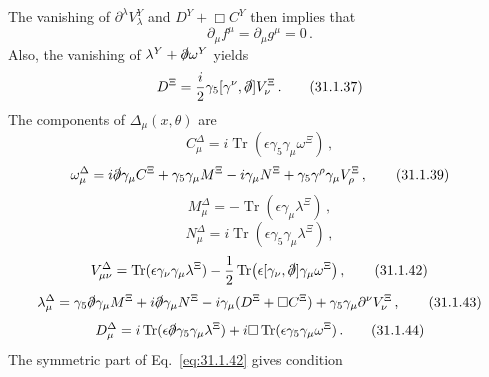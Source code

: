 The vanishing of \(\partial^\lambda V_\lambda^Y\) and
\(D^Y+\Box C^Y\) then implies that
\begin{equation}
  \partial_\mu f^\mu=\partial_\mu g^\mu=0\,.
  \tag{31.1.36}\label{eq:31.1.36}
\end{equation}
Also, the vanishing of \(\lambda^Y+\sl{\partial}\omega^Y\) yields
\begin{equation}
  D^\Xi
  =\frac{i}{2}\gamma_5[\gamma^\nu,\sl{\partial}]V_\nu^\Xi\,.
  \tag{31.1.37}\label{eq:31.1.37}
\end{equation}
The components of \(\Delta_\mu(x,\theta)\) are
\begin{equation}
  C_\mu^\Delta
  =i\operatorname{Tr}(\epsilon\gamma_5\gamma_\mu\omega^\Xi)\,,
  \tag{31.1.38}\label{eq:31.1.38}
\end{equation}
\begin{equation}
  \omega_\mu^\Delta
  =i\sl{\partial}\gamma_\mu C^\Xi
   +\gamma_5\gamma_\mu M^\Xi-i\gamma_\mu N^\Xi
   +\gamma_5\gamma^\rho\gamma_\mu V_\rho^\Xi\,,
  \tag{31.1.39}\label{eq:31.1.39}
\end{equation}
\begin{equation}
  M_\mu^\Delta
  =-\operatorname{Tr}(\epsilon\gamma_\mu\lambda^\Xi)\,,
  \tag{31.1.40}\label{eq:31.1.40}
\end{equation}
\begin{equation}
  N_\mu^\Delta
  =i\operatorname{Tr}(\epsilon\gamma_5\gamma_\mu\lambda^\Xi)\,,
  \tag{31.1.41}\label{eq:31.1.41}
\end{equation}
\begin{equation}
  V_{\mu\nu}^\Delta
  =\operatorname{Tr}(\epsilon\gamma_\nu\gamma_\mu\lambda^\Xi)
   -\frac12\operatorname{Tr}
    \bigl(\epsilon[\gamma_\nu,\sl{\partial}]
      \gamma_\mu\omega^\Xi\bigr)\,,
  \tag{31.1.42}\label{eq:31.1.42}
\end{equation}
\begin{equation}
  \lambda_\mu^\Delta
  =\gamma_5\sl{\partial}\gamma_\mu M^\Xi
   +i\sl{\partial}\gamma_\mu N^\Xi
   -i\gamma_\mu(D^\Xi+\Box C^\Xi)
   +\gamma_5\gamma_\mu\partial^\nu V_\nu^\Xi\,,
  \tag{31.1.43}\label{eq:31.1.43}
\end{equation}
\begin{equation}
  D_\mu^\Delta
  =i\operatorname{Tr}
    (\epsilon\sl{\partial}\gamma_5\gamma_\mu\lambda^\Xi)
   +i\Box\operatorname{Tr}
    (\epsilon\gamma_5\gamma_\mu\omega^\Xi)\,.
  \tag{31.1.44}\label{eq:31.1.44}
\end{equation}
The symmetric part of Eq.~\eqref{eq:31.1.42} gives condition
